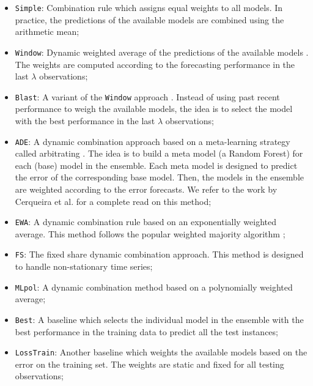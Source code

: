 \documentclass[smallcondensed]{svjour3}
\begin{document}
\begin{itemize}
    
    \item \texttt{Simple}: Combination rule which assigns equal weights to all models. In practice, the predictions of the available models are combined using the arithmetic mean;
    
    \item \texttt{Window}: Dynamic weighted average of the predictions of the available models \cite{newbold1974experience}. The weights are computed according to the forecasting performance in the last $\lambda$ observations;
    
    \item \texttt{Blast}: A variant of the \texttt{Window} approach \cite{Blast}. Instead of using past recent performance to weigh the available models, the idea is to select the model with the best performance in the last $\lambda$ observations;
    
    \item \texttt{ADE}: A dynamic combination approach based on a meta-learning strategy called arbitrating \cite{cerqueira2019arbitrage}. The idea is to build a meta model (a Random Forest) for each (base) model in the ensemble. Each meta model is designed to predict the error of the corresponding base model. Then, the models in the ensemble are weighted according to the error forecasts. We refer to the work by Cerqueira et al. \cite{cerqueira2019arbitrage} for a complete read on this method;
    
    \item \texttt{EWA}: A dynamic combination rule based on an exponentially weighted average. This method follows the popular weighted majority algorithm \cite{Cesa-Bianchi:2006:PLG:1137817};
    
    \item \texttt{FS}: The fixed share dynamic combination approach. This method is designed to handle non-stationary time series;
    
    \item \texttt{MLpol}: A dynamic combination method based on a polynomially weighted average;
    
    \item \texttt{Best}: A baseline which selects the individual model in the ensemble with the best performance in the training data to predict all the test instances;
    
    \item \texttt{LossTrain}: Another baseline which weights the available models based on the error on the training set. The weights are static and fixed for all testing observations;
    
\end{itemize}
\end{document}
